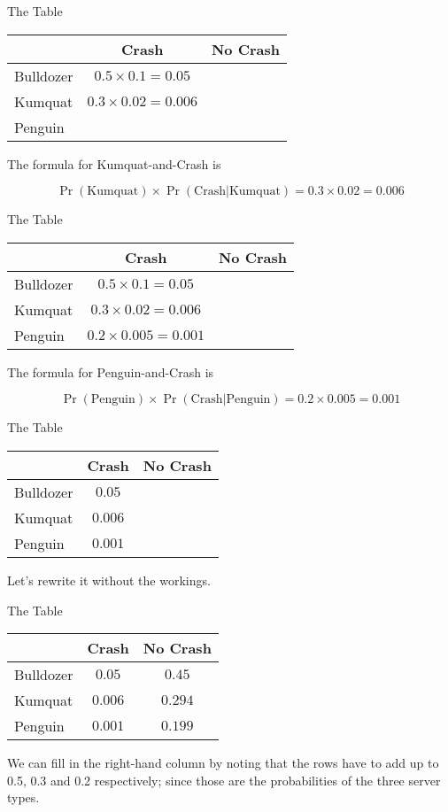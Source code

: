\documentclass[
  ignorenonframetext,
]{beamer}
\renewcommand{\,}{\text{, }}
\begin{document}
\begin{frame}{The Table}
\protect\hypertarget{the-table-1}{}
\begin{longtable}[]{@{}lcc@{}}
\toprule
& Crash & No Crash \\
\midrule
\endhead
Bulldozer & \(0.5 \times 0.1 = 0.05\) & \\
Kumquat & \(0.3 \times 0.02 = 0.006\) & \\
Penguin & & \\
\bottomrule
\end{longtable}

The formula for Kumquat-and-Crash is

\[
\Pr(\text{Kumquat}) \times \Pr(\text{Crash}|\text{Kumquat}) = 0.3 \times 0.02 = 0.006
\]
\end{frame}

\begin{frame}{The Table}
\protect\hypertarget{the-table-2}{}
\begin{longtable}[]{@{}lcc@{}}
\toprule
& Crash & No Crash \\
\midrule
\endhead
Bulldozer & \(0.5 \times 0.1 = 0.05\) & \\
Kumquat & \(0.3 \times 0.02 = 0.006\) & \\
Penguin & \(0.2 \times 0.005 = 0.001\) & \\
\bottomrule
\end{longtable}

The formula for Penguin-and-Crash is

\[
\Pr(\text{Penguin}) \times \Pr(\text{Crash}|\text{Penguin}) = 0.2 \times 0.005 = 0.001
\]
\end{frame}

\begin{frame}{The Table}
\protect\hypertarget{the-table-3}{}
\begin{longtable}[]{@{}lcc@{}}
\toprule
& Crash & No Crash \\
\midrule
\endhead
Bulldozer & \(0.05\) & \\
Kumquat & \(0.006\) & \\
Penguin & \(0.001\) & \\
\bottomrule
\end{longtable}

Let's rewrite it without the workings.
\end{frame}

\begin{frame}{The Table}
\protect\hypertarget{the-table-4}{}
\begin{longtable}[]{@{}lcc@{}}
\toprule
& Crash & No Crash \\
\midrule
\endhead
Bulldozer & \(0.05\) & \(0.45\) \\
Kumquat & \(0.006\) & \(0.294\) \\
Penguin & \(0.001\) & \(0.199\) \\
\bottomrule
\end{longtable}

We can fill in the right-hand column by noting that the rows have to add
up to 0.5, 0.3 and 0.2 respectively; since those are the probabilities
of the three server types.
\end{frame}
\end{document}
